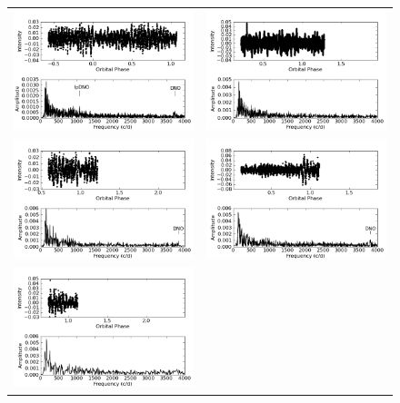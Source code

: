 \begin{figure}
\begin{narrow}{-0.25in}{1.5in}
\begin{tabular}{lr}
 \includegraphics[width = 0.50\columnwidth, bb=0 0 600 400]{images/archive_phot/norm_int_eclipsing/S6544_c_FF.png} & 
 \includegraphics[width = 0.50\columnwidth, bb=0 0 600 400]{images/archive_phot/norm_int_eclipsing/S6548d_cc_FF.png}  \\
 \includegraphics[width = 0.50\columnwidth, bb=0 0 600 400]{images/archive_phot/norm_int_eclipsing/S6549d_FF.png} &
 \includegraphics[width = 0.50\columnwidth, bb=0 0 600 400]{images/archive_phot/norm_int_eclipsing/S6551d_FF.png} \\
\includegraphics[width = 0.50\columnwidth, bb=0 0 600 400]{images/archive_phot/norm_int_eclipsing/S6555d_FF.png} &

\end{tabular}
\end{narrow}
\end{figure}

